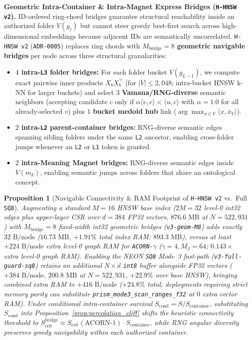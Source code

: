 \documentclass[conference]{IEEEtran}
\newtheorem{proposition}{Proposition}
\begin{document}
\noindent\textbf{Geometric Intra-Container \& Intra-Magnet Express Bridges (\texttt{H-HNSW v2}).}
ID-ordered ring-chord bridges guarantee structural reachability inside an authorized folder $V(g_\ell)$ but cannot steer greedy best-first search across high-dimensional embeddings because adjacent IDs are semantically uncorrelated. \texttt{H-HNSW v2} (\texttt{ADR-0005}) replaces ring chords with \textbf{$M_{\text{bridge}}=8$ geometric navigable bridges} per node across three structural granularities:
\begin{itemize}
    \item \textbf{$4$ intra-\texttt{L3} folder bridges:} For each folder bucket $V(g_{L-1})$, we compute exact pairwise inner products $X_b X_b^\top$ (for $|V| \le 2{,}048$; intra-bucket HNSW k-NN for larger buckets) and select $3$ \textbf{Vamana/RNG-diverse} semantic neighbors (accepting candidate $c$ only if $\alpha \langle v, c \rangle < \langle u, c \rangle$ with $\alpha = 1.0$ for all already-selected $v$) plus $1$ \textbf{bucket medoid hub} link ($\arg\max_{x \in V} \langle x, \bar{x}_V \rangle$).
    \item \textbf{$2$ intra-\texttt{L2} parent-container bridges:} RNG-diverse semantic edges spanning sibling folders under the same \texttt{L2} ancestor, enabling cross-folder jumps whenever an \texttt{L2} or \texttt{L1} token is granted.
    \item \textbf{$2$ intra-Meaning Magnet bridges:} RNG-diverse semantic edges inside $V(m_k)$, enabling semantic jumps across folders that share an ontological concept.
\end{itemize}

\begin{proposition}[Navigable Connectivity \& RAM Footprint of \texttt{H-HNSW v2} vs.\ Full \texttt{SQ8}]
\label{prop:express_bridges}
Augmenting a standard $M=16$ HNSW base index ($2M=32$ level-0 int32 edges plus upper-layer CSR over $d=384$ FP32 vectors, $876.6\text{ MB}$ at $N=522{,}931$) with $M_{\text{bridge}}=8$ fixed-width int32 geometric bridges (\texttt{v3-geom-M8}) adds exactly $32\text{ B/node}$ ($16.73\text{ MB}$, $+1.91\%$ total index RAM: $893.3\text{ MB}$), versus at least $+224\text{ B/node}$ extra level-0 graph RAM for \texttt{ACORN-$\gamma$} ($\gamma=4, M_\beta=64$; $0.143\times$ extra level-0 graph RAM). Enabling the NEON \texttt{SQ8} Mode~3 fast-path (\texttt{v3-full-guard-sq8}) retains an additional $N \times d$ \texttt{int8} buffer alongside FP32 vectors ($+384\text{ B/node}$, $200.8\text{ MB}$ at $N=522{,}931$, $+22.9\%$ over base HNSW), bringing combined extra RAM to $+416\text{ B/node}$ ($+24.8\%$ total; deployments requiring strict memory parity can substitute \texttt{prism\_mode3\_scan\_ranges\_f32} at $0$ extra vector RAM). Under conditional intra-container survival $S_{\text{cond}} = S / S_{\text{container}}$, substituting $S_{\text{cond}}$ into Proposition~\ref{prop:percolation_cliff} shifts the heuristic connectivity threshold to $S_{\text{crit}}^{\text{bridge}} \approx S_{\text{crit}}(\text{ACORN-1}) \cdot S_{\text{container}}$, while RNG angular diversity preserves greedy navigability within each authorized container.
\end{proposition}
\end{document}
